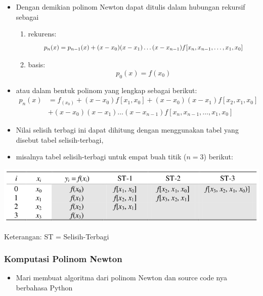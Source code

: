 \documentclass[pdflatex,compress,mathserif]{beamer}
\newcommand*{\Scale}[2][4]{\scalebox{#1}{$#2$}}%
\begin{document}
\begin{frame}
	\begin{itemize}
		\item Dengan demikian polinom Newton dapat ditulis dalam hubungan rekursif sebagai
		\begin{enumerate}
			\item rekurens:
			\[\Scale[0.9]{ p_n(x) = p_{n-1}(x) + (x-x_0 ) (x-x_1) \dots (x-x_{n-1}) f[x_n , x_{n-1} , \dots, x_1 , x_0] }\]
			\item basis:
			\[ p_0(x) = f (x_0) \]
		\end{enumerate}
		\item atau dalam bentuk polinom yang lengkap sebagai berikut:
		\begin{align*}
			p_n(x) &= f_(x_0) + (x-x_0)f[x_1, x_0] + (x-x_0)(x-x_1) f[x_2, x_1, x_0] \\
			&+ (x - x_0) (x - x_1) \dots (x - x_{n-1}) f[x_n, x_{n-1} , \dots, x_1, x_0]
		\end{align*}
	\end{itemize}
\end{frame}

\begin{frame}
	\begin{itemize}
		\item Nilai selisih terbagi ini dapat dihitung dengan menggunakan tabel yang disebut tabel selisih-terbagi,
		\item misalnya tabel selisih-terbagi untuk empat buah titik ($ n = 3 $) berikut:
	\end{itemize}
	\begin{center}
		\includegraphics[width=\linewidth]{img/img11}
	\end{center}
	Keterangan: ST = Selisih-Terbagi
\end{frame}

\begin{frame}
	\frametitle{Komputasi Polinom Newton}
	\begin{itemize}
		\item Mari membuat algoritma dari polinom Newton dan source code nya berbahasa Python
	\end{itemize}
\end{frame}
\end{document}
